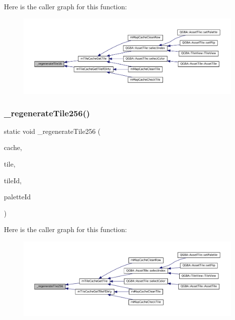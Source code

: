 Here is the caller graph for this function\+:
\nopagebreak
\begin{figure}[H]
\begin{center}
\leavevmode
\includegraphics[width=350pt]{tile-cache_8c_ac73c7b43d4ecb49d64c6e6f47d5295a6_icgraph}
\end{center}
\end{figure}
\mbox{\label{tile-cache_8c_aa8513c1bab92e82135f641819efb62ef}} 
\subsubsection{\texorpdfstring{\+\_\+regenerate\+Tile256()}{\_regenerateTile256()}}
{\footnotesize\ttfamily static void \+\_\+regenerate\+Tile256 (\begin{DoxyParamCaption}\item[{struct m\+Tile\+Cache $\ast$}]{cache,  }\item[{color\+\_\+t $\ast$}]{tile,  }\item[{unsigned}]{tile\+Id,  }\item[{unsigned}]{palette\+Id }\end{DoxyParamCaption})\hspace{0.3cm}{\ttfamily [static]}}

Here is the caller graph for this function\+:
\nopagebreak
\begin{figure}[H]
\begin{center}
\leavevmode
\includegraphics[width=350pt]{tile-cache_8c_aa8513c1bab92e82135f641819efb62ef_icgraph}
\end{center}
\end{figure}
\mbox{\label{tile-cache_8c_a2ce7618147b6635261531801824ce86c}} 

